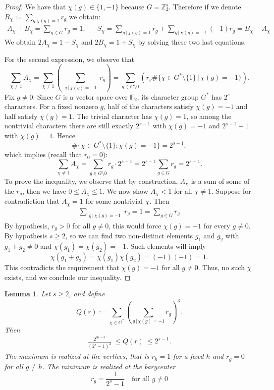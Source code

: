 \documentclass[12pt,twoside,]{amsart}
\theoremstyle{plain}
\newtheorem{lemma}[theorem]{Lemma}
\theoremstyle{definition}
\begin{document}
\begin{proof}
We have that \(\chi(g) \in \{1,-1\}\) because
$G = \mathbb{Z}_2^s$. Therefore if we denote
\( 
B_\chi := \sum_{g | \chi(g) = 1}
 r_g
\)
we obtain:
\begin{align*}
A_\chi + B_\chi = \sum_{g \in G} r_g = 1,
&&
S_\chi
= \sum_{g \, | \, \chi(g) = 1} r_g + 
\sum_{g \, | \,\chi(g) = -1} (-1)r_g
=  B_\chi- A_\chi
\end{align*}
We obtain $2A_\chi = 1 - S_\chi$ 
and $2B_\chi = 1 + S_\chi$ 
by solving these two last equations.

For the second expression, we observe that
\[
\sum_{\chi \neq 1} A_\chi
= \sum_{\chi \neq 1} 
\left( 
\sum_{\substack{g \, | \, \chi(g) = -1}} r_g
\right)
= \sum_{g \in G \setminus 0} 
\left(
r_g  \#\{\chi \in G^* \setminus\{1\} \, |\, \chi(g) = -1\}
\right).
\]
Fix $g \neq 0$.
Since $G$ is a vector space over $\mathbb{F}_2$, its character group $G^*$ has $2^s$ characters.
For a fixed nonzero $g$, half of the characters satisfy $\chi(g) = -1$ and half satisfy $\chi(g)=1$.
The trivial character has $\chi(g)=1$, so among the nontrivial characters there are still exactly $2^{s-1}$ with $\chi(g)=-1$
and $2^{s-1}-1$ with $\chi(g)=1$.
Hence
\[
\#\{\chi \in G^* \setminus\{1\} : \chi(g) = -1\} = 2^{s-1},
\]
which implies (recall that $r_0 = 0$):
\[
\sum_{\chi \neq 1} A_\chi
= \sum_{g \in G \setminus 0 } r_g \cdot 2^{s-1}
= 2^{s-1} \sum_{g \in G } r_g
= 2^{s-1}.
\]
To prove the inequality, we observe that by construction, $A_\chi$ is a sum of some of the $r_g$, then we have
\(
0 \leq  A_\chi \le 1.
\)
We now show $A_\chi < 1$ for all $\chi \neq 1$. Suppose for contradiction that $A_\chi = 1$ for some nontrivial $\chi$.
Then
\begin{align*}
\sum_{\substack{g \, | \, \chi(g) = -1}} r_g = 1
=
\sum_{g \in G} r_g 
\end{align*}
By hypothesis, $r_g>0$ for all $g\neq 0$, this would force $\chi(g) = -1$ for every $g \neq 0$.
By hypothesis $s \geq 2$, so we can find two non-distinct elements $g_1$ and $g_2$ with $g_1 +g_2 \neq 0$ and $\chi(g_1)=\chi(g_2)=-1$. Such elements will imply
\[
\chi(g_1+g_2) = \chi(g_1)\chi(g_2) = (-1)(-1) = 1.
\]
This contradicts the requirement that $\chi(g)=-1$ for all $g\neq 0$.
Thus, no such $\chi$ exists, and we conclude our inequality.
\end{proof}
\begin{lemma}
\label{lemma:bound_sum_cubs}
Let $s \geq 2$, and define
 \[
 Q(r):=
  \sum_{\chi \in G^*} 
   \left( 
  \sum_{g \, | \, \chi(g) =-1}   
  r_g
  \right)^3.
 \]
Then
\begin{align*}
\frac{2^{3s-3}}{(2^s-1)^2}    \;  \leq Q(r)  \;  \leq 2^{s-1}.
\end{align*}
The maximum is realized at the vertices, that is $r_h=1$ for a fixed $h$ and $r_g=0$ for all $g\neq h$. The minimum is realized at the barycenter 
\[
r_g = \frac{1}{2^s-1} \quad \text{for all } g \neq 0
\]
\end{lemma}
\end{document}
